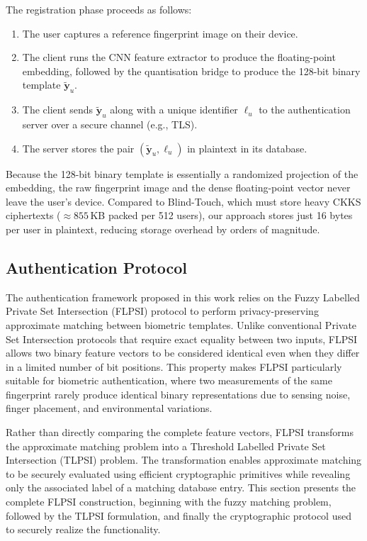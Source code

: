 \documentclass[11pt,a4paper]{article}
\begin{document}
The registration phase proceeds as follows:
\begin{enumerate}
    \item The user captures a reference fingerprint image on their device.
    \item The client runs the CNN feature extractor to produce the floating-point embedding, followed by the quantisation bridge to produce the 128-bit binary template $\tilde{\mathbf{y}}_u$.
    \item The client sends $\tilde{\mathbf{y}}_u$ along with a unique identifier $\ell_u$ to the authentication server over a secure channel (e.g., TLS).
    \item The server stores the pair $(\tilde{\mathbf{y}}_u, \ell_u)$ in plaintext in its database.
\end{enumerate}

Because the 128-bit binary template is essentially a randomized projection of the embedding, the raw fingerprint image and the dense floating-point vector never leave the user's device. Compared to Blind-Touch, which must store heavy CKKS ciphertexts ($\approx855$\,KB packed per 512 users), our approach stores just 16 bytes per user in plaintext, reducing storage overhead by orders of magnitude.

\subsection{Authentication Protocol}
The authentication framework proposed in this work relies on the Fuzzy Labelled Private Set Intersection (FLPSI) protocol to perform privacy-preserving approximate matching between biometric templates. Unlike conventional Private Set Intersection protocols that require exact equality between two inputs, FLPSI allows two binary feature vectors to be considered identical even when they differ in a limited number of bit positions. This property makes FLPSI particularly suitable for biometric authentication, where two measurements of the same fingerprint rarely produce identical binary representations due to sensing noise, finger placement, and environmental variations.

Rather than directly comparing the complete feature vectors, FLPSI transforms the approximate matching problem into a Threshold Labelled Private Set Intersection (TLPSI) problem. The transformation enables approximate matching to be securely evaluated using efficient cryptographic primitives while revealing only the associated label of a matching database entry. This section presents the complete FLPSI construction, beginning with the fuzzy matching problem, followed by the TLPSI formulation, and finally the cryptographic protocol used to securely realize the functionality.
\end{document}
